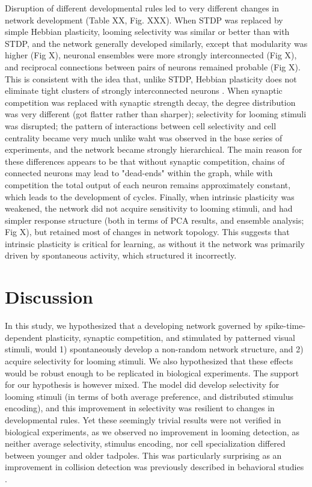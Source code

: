 \documentclass{article}
\begin{document}
Disruption of different developmental rules led to very different changes in network development (Table XX, Fig. XXX). When STDP was replaced by simple Hebbian plasticity, looming selectivity was similar or better than with STDP, and the network generally developed similarly, except that modularity was higher (Fig X), neuronal ensembles were more strongly interconnected (Fig X), and reciprocal connections between pairs of neurons remained probable (Fig X). This is consistent with the idea that, unlike STDP, Hebbian plasticity does not eliminate tight clusters of strongly interconnected neurons \citep{fiete2010chains}. When synaptic competition was replaced with synaptic strength decay, the degree distribution was very different (got flatter rather than sharper); selectivity for looming stimuli was disrupted; the pattern of interactions between cell selectivity and cell centrality became very much unlike waht was observed in the base series of experiments, and the network became strongly hierarchical. The main reason for these differences appears to be that without synaptic competition, chains of connected neurons may lead to "dead-ends" within the graph, while with competition the total output of each neuron remains approximately constant, which leads to the development of cycles. Finally, when intrinsic plasticity was weakened, the network did not acquire sensitivity to looming stimuli, and had simpler response structure (both in terms of PCA results, and ensemble analysis; Fig X), but retained most of changes in network topology. This suggests that intrinsic plasticity is critical for learning, as without it the network was primarily driven by spontaneous activity, which structured it incorrectly.

\section*{Discussion}

In this study, we hypothesized that a developing network governed by spike-time-dependent plasticity, synaptic competition, and stimulated by patterned visual stimuli, would 1) spontaneously develop a non-random network structure, and 2) acquire selectivity for looming stimuli. We also hypothesized that these effects would be robust enough to be replicated in biological experiments. The support for our hypothesis is however mixed. The model did develop selectivity for looming stimuli (in terms of both average preference, and distributed stimulus encoding), and this improvement in selectivity was resilient to changes in developmental rules. Yet these seemingly trivial results were not verified in biological experiments, as we observed no improvement in looming detection, as neither average selectivity, stimulus encoding, nor cell specialization differed between younger and older tadpoles. This was particularly surprising as an improvement in collision detection was previously described in behavioral studies \citep{dong2009}.
\end{document}
